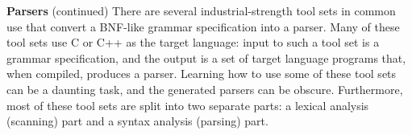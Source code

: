 \begin{minipage}[t]{\sw}
\slidenumber
\LARGE
{\bf Parsers} (continued)\exx
\emm{\Large\LightBox{\MYlon}}\exx
There are several industrial-strength tool sets in common use
that convert a BNF-like grammar specification 
into a parser.
Many of these tool sets use C or C++ as the target language:
input to such a tool set is a grammar specification,
and the output is a set of target language programs
that, when compiled, produces a parser.
Learning how to use some of these tool sets can be a daunting task,
and the generated parsers can be obscure.
Furthermore, most of these tool sets are split
into two separate parts:
a lexical analysis (scanning) part and a syntax analysis (parsing) part.\exx
\end{minipage}
\clearpage
